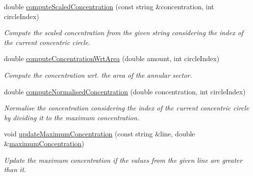 \begin{DoxyCompactItemize}
double \hyperlink{classmultiscale_1_1video_1_1PolarCsvToInputFilesConverter_adfaf1d1912fa6f511033ace081381ac8}{compute\-Scaled\-Concentration} (const string \&concentration, int circle\-Index)
\begin{DoxyCompactList}\small\item\em \-Compute the scaled concentration from the given string considering the index of the current concentric circle. \end{DoxyCompactList}\item 
double \hyperlink{classmultiscale_1_1video_1_1PolarCsvToInputFilesConverter_aa35b7d511b76a3c145e25886e2e76daa}{compute\-Concentration\-Wrt\-Area} (double amount, int circle\-Index)
\begin{DoxyCompactList}\small\item\em \-Compute the concentration wrt. the area of the annular sector. \end{DoxyCompactList}\item 
double \hyperlink{classmultiscale_1_1video_1_1PolarCsvToInputFilesConverter_a5fc03b210507a363037a694fdbc95b2b}{compute\-Normalised\-Concentration} (double concentration, int circle\-Index)
\begin{DoxyCompactList}\small\item\em \-Normalise the concentration considering the index of the current concentric circle by dividing it to the maximum concentration. \end{DoxyCompactList}\item 
void \hyperlink{classmultiscale_1_1video_1_1PolarCsvToInputFilesConverter_ae624c0a8fe97d266cbc127d64af707de}{update\-Maximum\-Concentration} (const string \&line, double \&\hyperlink{classmultiscale_1_1video_1_1PolarCsvToInputFilesConverter_a89b7dce2825cd5c8c45a1e6f19770e5f}{maximum\-Concentration})
\begin{DoxyCompactList}\small\item\em \-Update the maximum concentration if the values from the given line are greater than it. \end{DoxyCompactList}\end{DoxyCompactItemize}
